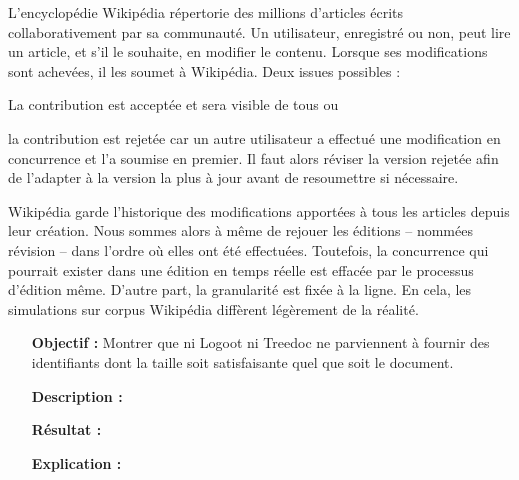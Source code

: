 L'encyclopédie Wikipédia répertorie des millions d'articles écrits
collaborativement par sa communauté. Un utilisateur, enregistré ou non, peut
lire un article, et s'il le souhaite, en modifier le contenu. Lorsque ses
modifications sont achevées, il les soumet à Wikipédia. Deux issues possibles :
\begin{inparaenum}[(i)]
\item La contribution est acceptée et sera visible de tous ou
\item la contribution est rejetée car un autre utilisateur a effectué une
  modification en concurrence et l'a soumise en premier. Il faut alors réviser
  la version rejetée afin de l'adapter à la version la plus à jour avant de
  resoumettre si nécessaire.
\end{inparaenum}
Wikipédia garde l'historique des modifications apportées à tous les articles
depuis leur création. Nous sommes alors à même de rejouer les éditions --
nommées révision -- dans l'ordre où elles ont été effectuées. Toutefois, la
concurrence qui pourrait exister dans une édition en temps réelle est effacée
par le processus d'édition même. D'autre part, la granularité est fixée à la
ligne. En cela, les simulations sur corpus Wikipédia diffèrent légèrement de la
réalité.

\begin{itemize}
\item [\textbf{Objectif :}] Montrer que ni Logoot ni Treedoc ne parviennent à
  fournir des identifiants dont la taille soit satisfaisante quel que soit le
  document.
\item [\textbf{Description :}] 
\item [\textbf{Résultat :}]
\item [\textbf{Explication :}]
\end{itemize}


